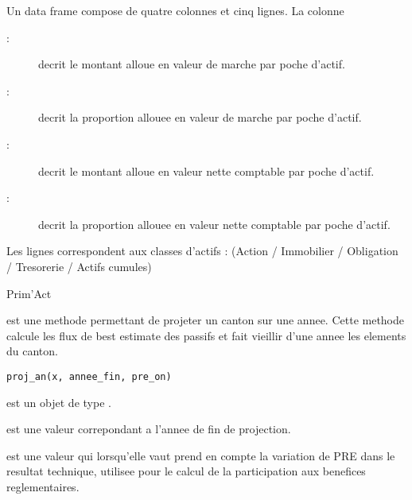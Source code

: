\documentclass[a4paper]{book}
\begin{document}
%
\begin{Value}
Un data frame compose de quatre colonnes et cinq lignes.
La colonne \begin{description}

\item[ : ] decrit le montant alloue en valeur de marche par poche d'actif.
\item[ : ] decrit la proportion allouee en valeur de marche par poche d'actif.
\item[ : ] decrit le montant alloue en valeur nette comptable par poche d'actif.
\item[ : ] decrit la proportion allouee en valeur nette comptable par poche d'actif.

\end{description}

Les lignes correspondent aux classes d'actifs : (Action / Immobilier / Obligation / Tresorerie / Actifs cumules)
\end{Value}
%
\begin{Author}\relax
Prim'Act
\end{Author}
%
\begin{Description}\relax
{} est une methode permettant de projeter un canton sur une annee. Cette methode calcule
les flux de best estimate des passifs et fait vieillir d'une annee les elements du canton.
\end{Description}
%
\begin{Usage}
\begin{verbatim}
proj_an(x, annee_fin, pre_on)
\end{verbatim}
\end{Usage}
%
\begin{Arguments}
\begin{ldescription}
\item[\code{x}] est un objet de type .

\item[\code{annee\_fin}] est une valeur  correpondant a l'annee de fin de projection.

\item[\code{pre\_on}] est une valeur  qui lorsqu'elle vaut  prend en compte la variation
de PRE dans le resultat technique, utilisee pour le calcul de la participation aux benefices reglementaires.
\end{ldescription}
\end{Arguments}
\end{document}
